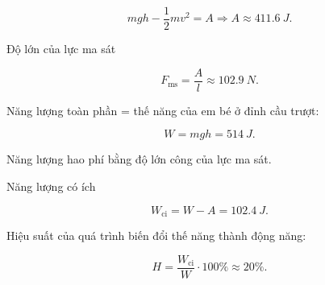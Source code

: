\begin{enumerate}[label=\bfseries Câu \arabic*:, leftmargin=1.5cm]
{		$$mgh - \dfrac{1}{2}mv^2 = A \Rightarrow A \approx \SI{411,6}{J}.$$
		
		Độ lớn của lực ma sát
		
		$$F_\text{ms} = \dfrac{A}{l} \approx \SI{102,9}{N}.$$
		
		Năng lượng toàn phần = thế năng của em bé ở đỉnh cầu trượt:
		
		$$W = mgh = \SI{514}{J}.$$
		
		Năng lượng hao phí bằng độ lớn công của lực ma sát. 
		
		Năng lượng có ích
		
		$$W_\text{ci} = W - A = \SI{102,4}{J}.$$
		
		Hiệu suất của quá trình biến đổi thế năng thành động năng:
		
		$$H = \dfrac{W_\text{ci}}{W} \cdot 100\% \approx 20\%.$$
	}
	
\end{enumerate}